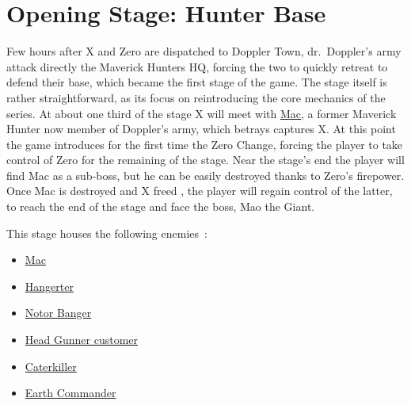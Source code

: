\section{Opening Stage: Hunter Base}\label{X3:intro_stage}
Few hours after X and Zero are dispatched to Doppler Town, dr.~Doppler's army attack directly the Maverick Hunters HQ, forcing the two to quickly retreat to defend their base, which became the first stage of the game. The stage itself is rather straightforward, as its focus on reintroducing the core mechanics of the series. At about one third of the stage X will meet with \hyperlink{miniboss:Mac}{Mac}, a former Maverick Hunter now member of Doppler's army, which betrays captures X. At this point the game introduces for the first time the Zero Change, forcing the player to take control of Zero for the remaining of the stage. Near the stage's end the player will find Mac as a sub-boss, but he can be easily destroyed thanks to Zero's firepower. Once Mac is destroyed  and X freed , the player will regain control of the latter, to reach the end of the stage and face the boss, Mao the Giant.

This stage houses  the following enemies~\cite{wiki:X3_opening}:
\begin{itemize}
	\item \hyperlink{miniboss:Mac}{Mac}
	\item \hyperlink{enem:Hangerter}{Hangerter}
	\item \hyperlink{enem:Notor_Banger}{Notor Banger}
	\item \hyperlink{enem:Head_Gunner_customer}{Head Gunner customer}
	\item \hyperlink{enem:Caterkiller}{Caterkiller}
	\item \hyperlink{enem:Earth_Commander}{Earth Commander}
\end{itemize}

